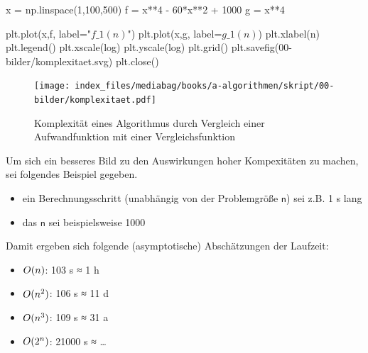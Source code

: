 \documentclass[
  letterpaper,
  DIV=11,
  numbers=noendperiod]{scrreprt}
\newenvironment{Shaded}{\begin{snugshade}}{\end{snugshade}}
\newcommand{\DecValTok}[1]{\textcolor[rgb]{0.68,0.00,0.00}{#1}}
\newcommand{\NormalTok}[1]{\textcolor[rgb]{0.00,0.23,0.31}{#1}}
\newcommand{\OperatorTok}[1]{\textcolor[rgb]{0.37,0.37,0.37}{#1}}
\newcommand{\StringTok}[1]{\textcolor[rgb]{0.13,0.47,0.30}{#1}}
\providecommand{\tightlist}{%
  \setlength{\itemsep}{0pt}\setlength{\parskip}{0pt}}\usepackage{longtable,booktabs,array}
\begin{document}
\begin{Shaded}
\begin{Highlighting}[]
\NormalTok{x }\OperatorTok{=}\NormalTok{ np.linspace(}\DecValTok{1}\NormalTok{,}\DecValTok{100}\NormalTok{,}\DecValTok{500}\NormalTok{)}
\NormalTok{f }\OperatorTok{=}\NormalTok{ x}\OperatorTok{**}\DecValTok{4} \OperatorTok{{-}} \DecValTok{60}\OperatorTok{*}\NormalTok{x}\OperatorTok{**}\DecValTok{2} \OperatorTok{+} \DecValTok{1000}
\NormalTok{g }\OperatorTok{=}\NormalTok{ x}\OperatorTok{**}\DecValTok{4}

\NormalTok{plt.plot(x,f, label}\OperatorTok{=}\StringTok{"$f\_1(n)$"}\NormalTok{)}
\NormalTok{plt.plot(x,g, label}\OperatorTok{=}\StringTok{\textquotesingle{}$g\_1(n)$\textquotesingle{}}\NormalTok{)}
\NormalTok{plt.xlabel(}\StringTok{\textquotesingle{}n\textquotesingle{}}\NormalTok{)}
\NormalTok{plt.legend()}
\NormalTok{plt.xscale(}\StringTok{\textquotesingle{}log\textquotesingle{}}\NormalTok{)}
\NormalTok{plt.yscale(}\StringTok{\textquotesingle{}log\textquotesingle{}}\NormalTok{)}
\NormalTok{plt.grid()}
\NormalTok{plt.savefig(}\StringTok{\textquotesingle{}00{-}bilder/komplexitaet.svg\textquotesingle{}}\NormalTok{)}
\NormalTok{plt.close()}
\end{Highlighting}
\end{Shaded}

\begin{figure}[H]

{\centering \texttt{[image: index\_files/mediabag/books/a-algorithmen/skript/00-bilder/komplexitaet.pdf]}

}

\caption{Komplexität eines Algorithmus durch Vergleich einer
Aufwandfunktion mit einer Vergleichsfunktion}

\end{figure}%

Um sich ein besseres Bild zu den Auswirkungen hoher Kompexitäten zu
machen, sei folgendes Beispiel gegeben.

\begin{itemize}
\tightlist
\item
  ein Berechnungsschritt (unabhängig von der Problemgröße \(\mathsf n\))
  sei z.B. 1 s lang
\item
  das \(\mathsf n\) sei beispielsweise 1000
\end{itemize}

Damit ergeben sich folgende (asymptotische) Abschätzungen der Laufzeit:

\begin{itemize}
\tightlist
\item
  \(\mathsf \mathcal{O}(n)\): 103 s ≈ 1 h
\item
  \(\mathsf \mathcal{O}(n^2)\): 106 s ≈ 11 d
\item
  \(\mathsf \mathcal{O}(n^3)\): 109 s ≈ 31 a
\item
  \(\mathsf \mathcal{O}(2^n)\): 21000 s ≈ \ldots{}
\end{itemize}
\end{document}
